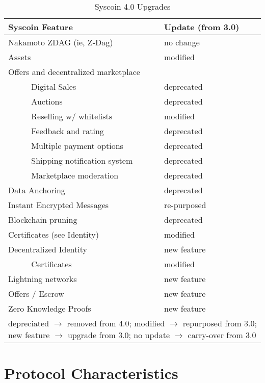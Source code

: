 \documentclass[peerreview]{ieeesyscoin}
\begin{document}
\begin{table}
\caption{Syscoin 4.0 Upgrades}
\label{table}
\setlength{\tabcolsep}{3pt}
\begin{tabular}{|p{135pt}|p{75pt}|}
\hline
Syscoin Feature & 
Update (from 3.0) \\

\hline
Nakamoto ZDAG (ie, Z-Dag) & no change \\
Assets & modified \\

Offers and decentralized marketplace &   \\
~~~~~ Digital Sales &  deprecated \\
~~~~~ Auctions &  deprecated \\
~~~~~ Reselling w/ whitelists &  modified \\
~~~~~ Feedback and rating &  deprecated \\
~~~~~ Multiple payment options &  deprecated \\
~~~~~ Shipping notification system &  deprecated \\
~~~~~ Marketplace moderation &  deprecated \\

Data Anchoring &  deprecated \\
Instant Encrypted Messages &  re-purposed \\
Blockchain pruning &  deprecated \\
Certificates (see Identity) &  modified \\
Decentralized Identity &  new feature \\
~~~~~ Certificates &  modified \\
Lightning networks &  new feature \\
Offers / Escrow &  new feature\\
Zero Knowledge Proofs &  new feature\\

\hline
\multicolumn{2}{p{251pt}}{depreciated  $\rightarrow$ removed from 4.0; modified  $\rightarrow$ repurposed from 3.0; new feature  $\rightarrow$ upgrade from 3.0; no update $\rightarrow$ carry-over from 3.0}\\

\end{tabular}
\label{tab1}
\end{table}


\section{Protocol Characteristics}
\label{sec:protocol}
\end{document}
